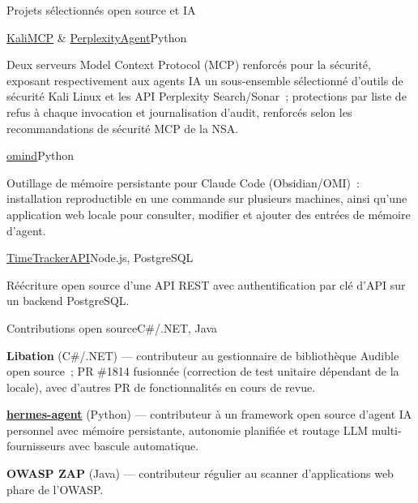 \documentclass{resume} %
\begin{document}
\begin{rSection}{Projets s\'electionn\'es open source et IA}

\begin{rSubsection}{\href{https://github.com/CryptoJones/KaliMCP}{KaliMCP} \& \href{https://github.com/CryptoJones/PerplexityAgent}{PerplexityAgent}}{Python}{}{}
\item Deux serveurs Model Context Protocol (MCP) renforc\'es pour la s\'ecurit\'e, exposant respectivement aux agents IA un sous-ensemble s\'electionn\'e d'outils de s\'ecurit\'e Kali Linux et les API Perplexity Search/Sonar~; protections par liste de refus \`a chaque invocation et journalisation d'audit, renforc\'es selon les recommandations de s\'ecurit\'e MCP de la NSA.
\end{rSubsection}

\begin{rSubsection}{\href{https://github.com/CryptoJones/omind}{omind}}{Python}{}{}
\item Outillage de m\'emoire persistante pour Claude Code (Obsidian/OMI)~: installation reproductible en une commande sur plusieurs machines, ainsi qu'une application web locale pour consulter, modifier et ajouter des entr\'ees de m\'emoire d'agent.
\end{rSubsection}

\begin{rSubsection}{\href{https://github.com/CryptoJones/TimeTrackerAPI}{TimeTrackerAPI}}{Node.js, PostgreSQL}{}{}
\item R\'e\'ecriture open source d'une API REST avec authentification par cl\'e d'API sur un backend PostgreSQL.
\end{rSubsection}

\begin{rSubsection}{Contributions open source}{C\#/.NET, Java}{}{}
\item {\bf Libation} (C\#/.NET) --- contributeur au gestionnaire de biblioth\`eque Audible open source~; PR \#1814 fusionn\'ee (correction de test unitaire d\'ependant de la locale), avec d'autres PR de fonctionnalit\'es en cours de revue.
\item {\bf \href{https://github.com/CryptoJones/hermes-agent}{hermes-agent}} (Python) --- contributeur \`a un framework open source d'agent IA personnel avec m\'emoire persistante, autonomie planifi\'ee et routage LLM multi-fournisseurs avec bascule automatique.
\item {\bf OWASP ZAP} (Java) --- contributeur r\'egulier au scanner d'applications web phare de l'OWASP.
\end{rSubsection}

\end{rSection}
\end{document}
